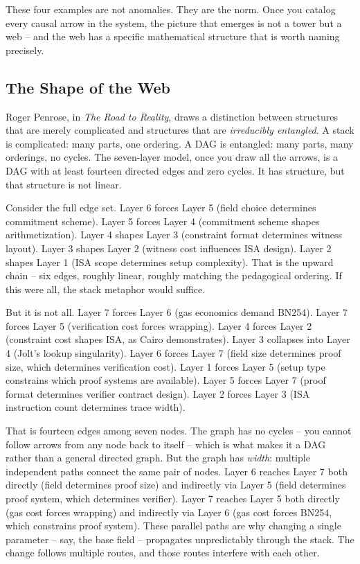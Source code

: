 \documentclass[
  11pt,
  openany]{report}
\begin{document}
These four examples are not anomalies. They are the norm. Once you catalog every
causal arrow in the system, the picture that emerges is not a tower but a web --
and the web has a specific mathematical structure that is worth naming
precisely.

\subsection{The Shape of the Web}\label{the-shape-of-the-web}

Roger Penrose, in \emph{The Road to Reality}, draws a distinction between
structures that are merely complicated and structures that are \emph{irreducibly
entangled}. A stack is complicated: many parts, one ordering. A DAG is
entangled: many parts, many orderings, no cycles. The seven-layer model, once
you draw all the arrows, is a DAG with at least fourteen directed edges and zero
cycles. It has structure, but that structure is not linear.

Consider the full edge set. Layer 6 forces Layer 5 (field choice determines
commitment scheme). Layer 5 forces Layer 4 (commitment scheme shapes
arithmetization). Layer 4 shapes Layer 3 (constraint format determines witness
layout). Layer 3 shapes Layer 2 (witness cost influences ISA design). Layer 2
shapes Layer 1 (ISA scope determines setup complexity). That is the upward chain
-- six edges, roughly linear, roughly matching the pedagogical ordering. If this
were all, the stack metaphor would suffice.

But it is not all. Layer 7 forces Layer 6 (gas economics demand BN254). Layer 7
forces Layer 5 (verification cost forces wrapping). Layer 4 forces Layer 2
(constraint cost shapes ISA, as Cairo demonstrates). Layer 3 collapses into
Layer 4 (Jolt's lookup singularity). Layer 6 forces Layer 7 (field size
determines proof size, which determines verification cost). Layer 1 forces Layer
5 (setup type constrains which proof systems are available). Layer 5 forces
Layer 7 (proof format determines verifier contract design). Layer 2 forces Layer
3 (ISA instruction count determines trace width).

That is fourteen edges among seven nodes. The graph has no cycles -- you cannot
follow arrows from any node back to itself -- which is what makes it a DAG
rather than a general directed graph. But the graph has \emph{width}: multiple
independent paths connect the same pair of nodes. Layer 6 reaches Layer 7 both
directly (field determines proof size) and indirectly via Layer 5 (field
determines proof system, which determines verifier). Layer 7 reaches Layer 5
both directly (gas cost forces wrapping) and indirectly via Layer 6 (gas cost
forces BN254, which constrains proof system). These parallel paths are why
changing a single parameter -- say, the base field -- propagates unpredictably
through the stack. The change follows multiple routes, and those routes
interfere with each other.
\end{document}
